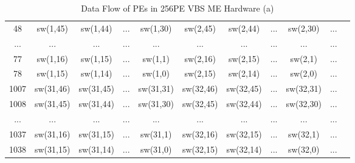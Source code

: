 \begin{table}[htbp]
\begin{tabular}{|c|c|c|c|c|c|c|c|c|c|c|}
		48 & sw(1,45) & sw(1,44) & ... & sw(1,30) & sw(2,45) & sw(2,44) & ... & sw(2,30) & ... \\
		
		... & ... & ... & ... & ... & ... & ... & ... & ... & ... \\
		
		77 & sw(1,16) & sw(1,15) & ... & sw(1,1) & sw(2,16) & sw(2,15) & ... & sw(2,1) & ... \\
		
		78 & sw(1,15) & sw(1,14) & ... & sw(1,0) & sw(2,15) & sw(2,14) & ... & sw(2,0) & ... \\
		
		\hline
		
		1007 & sw(31,46) & sw(31,45) & ... & sw(31,31) & sw(32,46) & sw(32,45) & ... & sw(32,31) & ... \\
		
		1008 & sw(31,45) & sw(31,44) & ... & sw(31,30) & sw(32,45) & sw(32,44) & ... & sw(32,30) & ... \\
		
		... & ... & ... & ... & ... & ... & ... & ... & ... & ... \\
		
		1037 & sw(31,16) & sw(31,15) & ... & sw(31,1) & sw(32,16) & sw(32,15) & ... & sw(32,1) & ... \\
		
		1038 & sw(31,15) & sw(31,14) & ... & sw(31,0) & sw(32,15) & sw(32,14) & ... & sw(32,0) & ... \\
		
		\hline
	\end{tabular}
	\caption{ Data Flow of PEs in 256PE VBS ME Hardware (a)}
\end{table}

